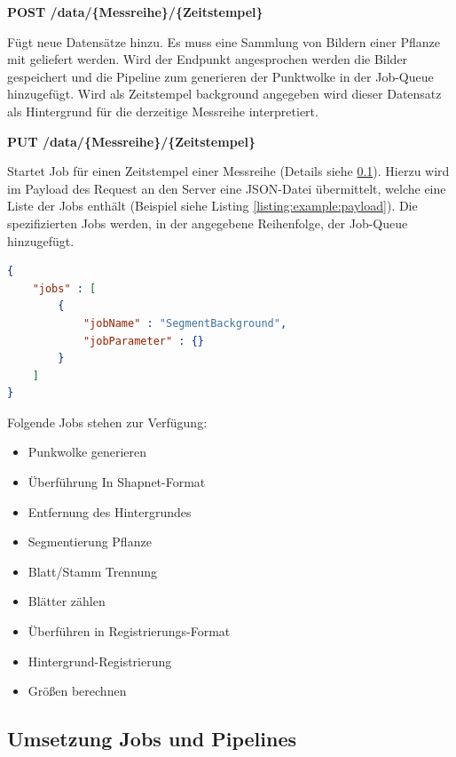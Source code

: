 \documentclass[12pt,titlepage, twoside]{article}
\begin{document}
\textbf{POST /data/\{Messreihe\}/\{Zeitstempel\}}

Fügt neue Datensätze hinzu. Es muss eine Sammlung von Bildern einer Pflanze mit geliefert werden. 
Wird der Endpunkt angesprochen werden die Bilder gespeichert und die Pipeline zum generieren der Punktwolke in der Job-Queue hinzugefügt.
Wird als Zeitstempel \glqq background\grqq{} angegeben wird dieser Datensatz als Hintergrund für die derzeitige Messreihe interpretiert.

\textbf{PUT /data/\{Messreihe\}/\{Zeitstempel\}}

Startet Job für einen Zeitstempel einer Messreihe (Details siehe \ref{sec:realisierung:implementierung5}). 
Hierzu wird im Payload des Request an den Server eine JSON-Datei übermittelt, welche eine Liste der Jobs enthält (Beispiel siehe Listing \ref{listing:example:payload}).
Die spezifizierten Jobs werden, in der angegebene Reihenfolge, der Job-Queue hinzugefügt.
\\

\begin{lstlisting}[language=json, caption={Beispiel Payload zum starten einer Pipeline}, captionpos=b, label=listing:example:payload]
{
    "jobs" : [
        {
            "jobName" : "SegmentBackground",
            "jobParameter" : {}
        }
    ]
}
\end{lstlisting}

Folgende Jobs stehen zur Verfügung:

\begin{itemize}
\item Punkwolke generieren
\item Überführung In Shapnet-Format 
\item Entfernung des Hintergrundes
\item Segmentierung Pflanze
\item Blatt/Stamm Trennung
\item Blätter zählen
\item Überführen in Registrierungs-Format 
\item Hintergrund-Registrierung
\item Größen berechnen
\end{itemize}


\subsection{Umsetzung Jobs und Pipelines}
\label{sec:realisierung:implementierung5}
\end{document}
